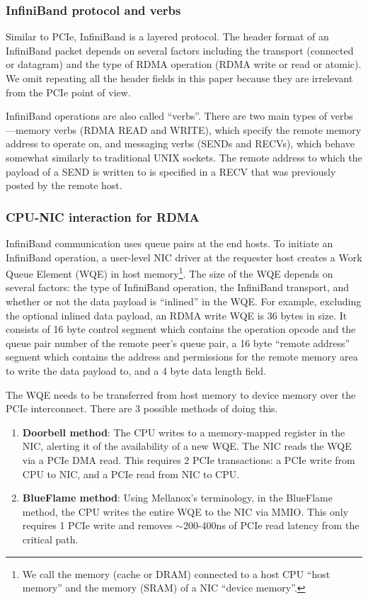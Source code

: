 \subsubsection{InfiniBand protocol and verbs}
Similar to PCIe, InfiniBand is a layered protocol. The header format of an
InfiniBand packet depends on several factors including the transport (connected
or datagram) and the type of RDMA operation (RDMA write or read or atomic). We
omit repeating all the header fields in this paper because they are irrelevant
from the PCIe point of view.

InfiniBand operations are also called ``verbs''. There are two main types of
verbs---memory verbs (RDMA READ and WRITE), which specify the remote memory
address to operate on, and messaging verbs (SENDs and RECVs), which behave
somewhat similarly to traditional UNIX sockets. The remote address to which the
payload of a SEND is written to is specified in a RECV that was previously
posted by the remote host.

\subsubsection{CPU-NIC interaction for RDMA}
InfiniBand communication uses queue pairs at the end hosts. To initiate an
InfiniBand operation, a user-level NIC driver at the requester host creates
a Work Queue Element (WQE) in host memory\footnote{We call the memory (cache
or DRAM) connected to a host CPU ``host memory'' and the memory (SRAM) of a NIC
``device memory''.}. The size of the WQE depends on several factors:
the type of InfiniBand operation, the InfiniBand transport, and whether or not
the data payload is ``inlined'' in the WQE. For example, excluding the optional
inlined data payload, an RDMA write WQE is 36 bytes in size. It consists of
16 byte control segment which contains the operation opcode and the queue pair
number of the remote peer's queue pair, a 16 byte ``remote address'' segment
which contains the address and permissions for the remote memory area to write
the data payload to, and a 4 byte data length field.


The WQE needs to be transferred from host memory to device memory over the
PCIe interconnect. There are 3 possible methods of doing this.

\begin{enumerate}
\item \textbf{Doorbell method}: The CPU writes to a memory-mapped register in
the NIC, alerting it of the availability of a new WQE. The NIC reads the WQE via
a PCIe DMA read. This requires 2 PCIe transactions: a PCIe write from CPU to NIC,
and a PCIe read from NIC to CPU.
\item \textbf{BlueFlame method}: Using Mellanox's terminology, in the BlueFlame
method, the CPU writes the entire WQE to the NIC via MMIO. This only requires
1 PCIe write and removes $\sim$200-400ns of PCIe read latency from the critical
path.
\end{enumerate}

